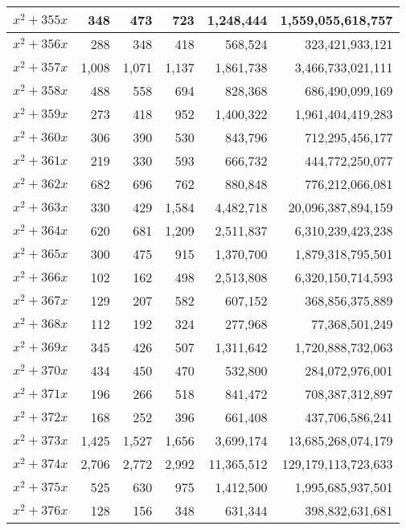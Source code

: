 \documentclass[a4paper]{amsproc}
\theoremstyle{plain}
\begin{document}
\begin{longtable}{ | l | r | r | r | r | r | }
$x^2 + 355x$ & 348 & 473 & 723 & 1{,}248{,}444 & 1{,}559{,}055{,}618{,}757 \\ \hline
$x^2 + 356x$ & 288 & 348 & 418 & 568{,}524 & 323{,}421{,}933{,}121 \\ \hline
$x^2 + 357x$ & 1{,}008 & 1{,}071 & 1{,}137 & 1{,}861{,}738 & 3{,}466{,}733{,}021{,}111 \\ \hline
$x^2 + 358x$ & 488 & 558 & 694 & 828{,}368 & 686{,}490{,}099{,}169 \\ \hline
$x^2 + 359x$ & 273 & 418 & 952 & 1{,}400{,}322 & 1{,}961{,}404{,}419{,}283 \\ \hline
$x^2 + 360x$ & 306 & 390 & 530 & 843{,}796 & 712{,}295{,}456{,}177 \\ \hline
$x^2 + 361x$ & 219 & 330 & 593 & 666{,}732 & 444{,}772{,}250{,}077 \\ \hline
$x^2 + 362x$ & 682 & 696 & 762 & 880{,}848 & 776{,}212{,}066{,}081 \\ \hline
$x^2 + 363x$ & 330 & 429 & 1{,}584 & 4{,}482{,}718 & 20{,}096{,}387{,}894{,}159 \\ \hline
$x^2 + 364x$ & 620 & 681 & 1{,}209 & 2{,}511{,}837 & 6{,}310{,}239{,}423{,}238 \\ \hline
$x^2 + 365x$ & 300 & 475 & 915 & 1{,}370{,}700 & 1{,}879{,}318{,}795{,}501 \\ \hline
$x^2 + 366x$ & 102 & 162 & 498 & 2{,}513{,}808 & 6{,}320{,}150{,}714{,}593 \\ \hline
$x^2 + 367x$ & 129 & 207 & 582 & 607{,}152 & 368{,}856{,}375{,}889 \\ \hline
$x^2 + 368x$ & 112 & 192 & 324 & 277{,}968 & 77{,}368{,}501{,}249 \\ \hline
$x^2 + 369x$ & 345 & 426 & 507 & 1{,}311{,}642 & 1{,}720{,}888{,}732{,}063 \\ \hline
$x^2 + 370x$ & 434 & 450 & 470 & 532{,}800 & 284{,}072{,}976{,}001 \\ \hline
$x^2 + 371x$ & 196 & 266 & 518 & 841{,}472 & 708{,}387{,}312{,}897 \\ \hline
$x^2 + 372x$ & 168 & 252 & 396 & 661{,}408 & 437{,}706{,}586{,}241 \\ \hline
$x^2 + 373x$ & 1{,}425 & 1{,}527 & 1{,}656 & 3{,}699{,}174 & 13{,}685{,}268{,}074{,}179 \\ \hline
$x^2 + 374x$ & 2{,}706 & 2{,}772 & 2{,}992 & 11{,}365{,}512 & 129{,}179{,}113{,}723{,}633 \\ \hline
$x^2 + 375x$ & 525 & 630 & 975 & 1{,}412{,}500 & 1{,}995{,}685{,}937{,}501 \\ \hline
$x^2 + 376x$ & 128 & 156 & 348 & 631{,}344 & 398{,}832{,}631{,}681 \\ \hline

\end{longtable}
\end{document}
